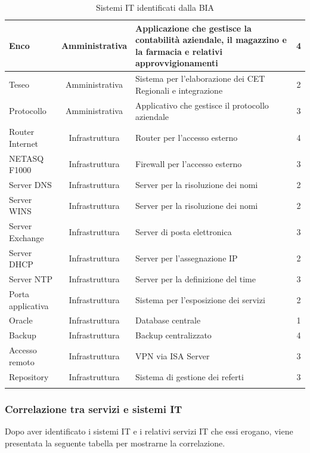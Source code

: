\documentclass[12pt, a4paper, titlepage]{report}
\begin{document}
\begin{longtable}{| p{4cm} | c | p{6cm} | c |}
				Enco & Amministrativa & Applicazione che gestisce la contabilità aziendale, il magazzino e la farmacia e relativi approvvigionamenti & 4 \\ \hline
				Teseo & Amministrativa & Sistema per l'elaborazione dei CET Regionali e integrazione & 2 \\ \hline
				Protocollo & Amministrativa & Applicativo che gestisce il protocollo aziendale & 3 \\ \hline
				Router Internet & Infrastruttura & Router per l'accesso esterno & 4 \\ \hline
				NETASQ F1000 & Infrastruttura & Firewall per l'accesso esterno & 3 \\ \hline
				Server DNS & Infrastruttura & Server per la risoluzione dei nomi & 2 \\ \hline
				Server WINS & Infrastruttura & Server per la risoluzione dei nomi & 2 \\ \hline
				Server Exchange & Infrastruttura & Server di posta elettronica & 3 \\ \hline
				Server DHCP & Infrastruttura & Server per l'assegnazione IP & 2 \\ \hline
				Server NTP & Infrastruttura & Server per la definizione del time & 3 \\ \hline
				Porta applicativa & Infrastruttura & Sistema per l'esposizione dei servizi & 2 \\ \hline
				Oracle & Infrastruttura & Database centrale & 1 \\ \hline
				Backup & Infrastruttura & Backup centralizzato & 4 \\ \hline
				Accesso remoto & Infrastruttura & VPN via ISA Server & 3 \\ \hline
				Repository & Infrastruttura & Sistema di gestione dei referti & 3 \\ \hline
				\caption{Sistemi IT identificati dalla BIA}
		\end{longtable}
		
		\subsubsection{Correlazione tra servizi e sistemi IT}
		
		Dopo aver identificato i sistemi IT e i relativi servizi IT che essi erogano, viene presentata la seguente tabella per mostrarne la correlazione.
		
\end{document}

